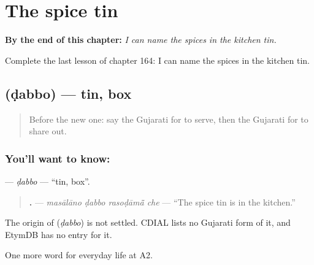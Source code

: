 
\chapter{The spice tin}
\label{ch:gu-the-spice-tin}

\begin{chapteropening}
\textbf{By the end of this chapter:} \emph{I can name the spices in the kitchen tin.}

Complete the last lesson of chapter 164: I can name the spices in the kitchen tin.
\end{chapteropening}

\section[\texorpdfstring{\gu{ડબ્બો} (ḍabbo)}{ડબ્બો (ḍabbo)}]{ (ḍabbo) — tin, box}

\label{lesson:GU-C164-dabbo}



\begin{quote}
Before the new one: say the Gujarati for to serve, then the Gujarati for to share out.
\end{quote}

\subsection*{You'll want to know: }
\textbf{} — \emph{ḍabbo} — \textquotedblleft{}tin, box\textquotedblright{}.

\begin{quote}
\textbf{   .} — \emph{masālāno ḍabbo rasoḍāmā̃ che} — \textquotedblleft{}The spice tin is in the kitchen.\textquotedblright{}
\end{quote}

\begin{cousinweb}
The origin of \textbf{} (\emph{ḍabbo}) is not settled. CDIAL lists no Gujarati form of it, and EtymDB has no entry for it.
\end{cousinweb}

\begin{grammarlens}[title={What you've built}]
One more word for everyday life at A2.
\end{grammarlens}

